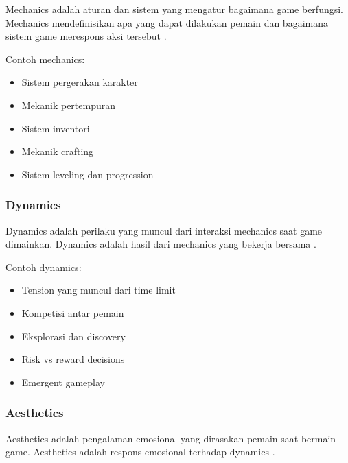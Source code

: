 \begin{definisi}[Mechanics]
Mechanics adalah aturan dan sistem yang mengatur bagaimana game berfungsi. Mechanics mendefinisikan apa yang dapat dilakukan pemain dan bagaimana sistem game merespons aksi tersebut \cite{Hunicke2004}.
\end{definisi}

Contoh mechanics:
\begin{itemize}
\item Sistem pergerakan karakter
\item Mekanik pertempuran
\item Sistem inventori
\item Mekanik crafting
\item Sistem leveling dan progression
\end{itemize}

\subsubsection{Dynamics}

\begin{definisi}[Dynamics]
Dynamics adalah perilaku yang muncul dari interaksi mechanics saat game dimainkan. Dynamics adalah hasil dari mechanics yang bekerja bersama \cite{Hunicke2004}.
\end{definisi}

Contoh dynamics:
\begin{itemize}
\item Tension yang muncul dari time limit
\item Kompetisi antar pemain
\item Eksplorasi dan discovery
\item Risk vs reward decisions
\item Emergent gameplay
\end{itemize}

\subsubsection{Aesthetics}

\begin{definisi}[Aesthetics]
Aesthetics adalah pengalaman emosional yang dirasakan pemain saat bermain game. Aesthetics adalah respons emosional terhadap dynamics \cite{Hunicke2004}.
\end{definisi}

